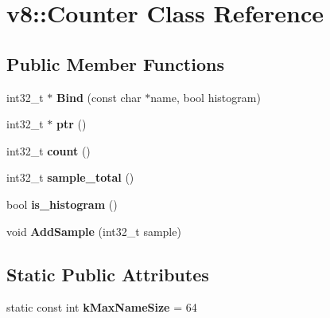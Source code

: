 \hypertarget{classv8_1_1_counter}{}\section{v8\+:\+:Counter Class Reference}
\label{classv8_1_1_counter}
\subsection*{Public Member Functions}
\begin{DoxyCompactItemize}
\item 
int32\+\_\+t $\ast$ {\bfseries Bind} (const char $\ast$name, bool histogram)\hypertarget{classv8_1_1_counter_a3d5c1db6f1a16fb30682fe0872d1850b}{}\label{classv8_1_1_counter_a3d5c1db6f1a16fb30682fe0872d1850b}

\item 
int32\+\_\+t $\ast$ {\bfseries ptr} ()\hypertarget{classv8_1_1_counter_a9b621d24818a32d04673b4f3abc55603}{}\label{classv8_1_1_counter_a9b621d24818a32d04673b4f3abc55603}

\item 
int32\+\_\+t {\bfseries count} ()\hypertarget{classv8_1_1_counter_abb91bdeaa89a1055f5566414d42ac7cb}{}\label{classv8_1_1_counter_abb91bdeaa89a1055f5566414d42ac7cb}

\item 
int32\+\_\+t {\bfseries sample\+\_\+total} ()\hypertarget{classv8_1_1_counter_a932e1cf3d4e1ad83ec279f14e9df3453}{}\label{classv8_1_1_counter_a932e1cf3d4e1ad83ec279f14e9df3453}

\item 
bool {\bfseries is\+\_\+histogram} ()\hypertarget{classv8_1_1_counter_abec9d55ada4b4407b00edbc02e2ab74e}{}\label{classv8_1_1_counter_abec9d55ada4b4407b00edbc02e2ab74e}

\item 
void {\bfseries Add\+Sample} (int32\+\_\+t sample)\hypertarget{classv8_1_1_counter_ae66b172d2409a791fdcb9836037b8a1b}{}\label{classv8_1_1_counter_ae66b172d2409a791fdcb9836037b8a1b}

\end{DoxyCompactItemize}
\subsection*{Static Public Attributes}
\begin{DoxyCompactItemize}
\item 
static const int {\bfseries k\+Max\+Name\+Size} = 64\hypertarget{classv8_1_1_counter_a706545f71074bdbebc9def4f07c76c85}{}\label{classv8_1_1_counter_a706545f71074bdbebc9def4f07c76c85}

\end{DoxyCompactItemize}
